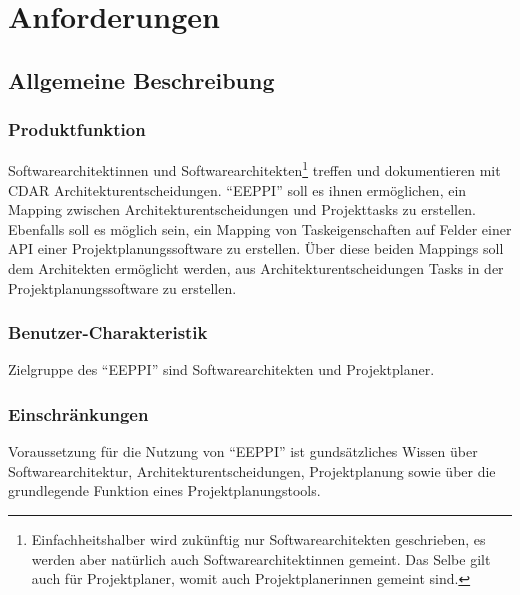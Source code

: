 \chapter{Anforderungen}
\section{Allgemeine Beschreibung}

\subsection{Produktfunktion}
Softwarearchitektinnen und Softwarearchitekten\footnote{Einfachheitshalber wird zukünftig nur Softwarearchitekten geschrieben, es werden aber natürlich auch Softwarearchitektinnen gemeint. Das Selbe gilt auch für Projektplaner, womit auch Projektplanerinnen gemeint sind.} treffen und dokumentieren mit CDAR Architekturentscheidungen.
"`EEPPI"' soll es ihnen ermöglichen, ein Mapping zwischen Architekturentscheidungen und Projekttasks zu erstellen.
Ebenfalls soll es möglich sein, ein Mapping von Taskeigenschaften auf Felder einer API einer Projektplanungssoftware zu erstellen.
Über diese beiden Mappings soll dem Architekten ermöglicht werden, aus Architekturentscheidungen Tasks in der Projektplanungssoftware zu erstellen.

\subsection{Benutzer-Charakteristik}
Zielgruppe des "`EEPPI"' sind Softwarearchitekten und Projektplaner.

\subsection{Einschränkungen}
Voraussetzung für die Nutzung von "`EEPPI"' ist gundsätzliches Wissen über Softwarearchitektur, Architekturentscheidungen, Projektplanung sowie über die grundlegende Funktion eines Projektplanungstools.

